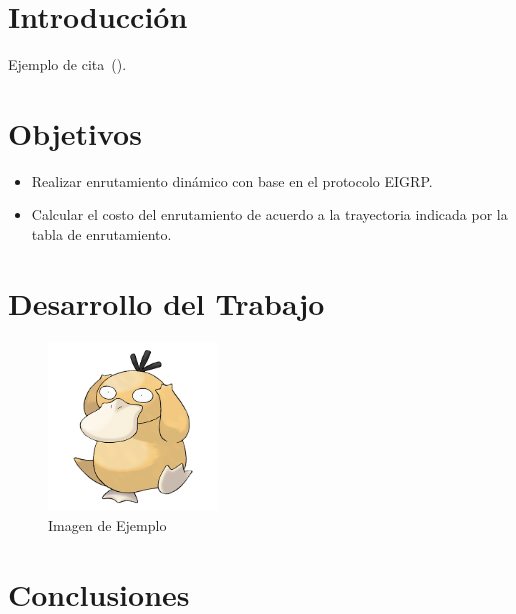 \setcounter{page}{1}


\section{Introducción}
    Ejemplo de cita~(\cite{buffett84}).
\section{Objetivos}
    \begin{itemize}
        \item Realizar enrutamiento dinámico con base en el protocolo EIGRP.
        \item Calcular el costo del enrutamiento de acuerdo a la trayectoria indicada por la tabla de enrutamiento.
    \end{itemize}

\section{Desarrollo del Trabajo}

    \begin{figure}[H]
        \centering
        \includegraphics[width=0.4\textwidth]{img/prueba.png}
        \caption{Imagen de Ejemplo}
        \label{fig:Imagen_Ejemplo}
    \end{figure}


\section{Conclusiones}

